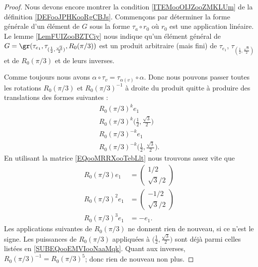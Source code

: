 \begin{proof}
    Nous devons encore montrer la condition \ref{ITEMooOIJZooZMKLUm} de la définition \ref{DEFooJPHKooRgCBJs}. Commençons par déterminer la forme générale d'un élément de \( G\) sous la forme \( \tau_a\circ r_0\) où \( r_0\) est une application linéaire. Le lemme \ref{LemFUIZooBZTCiy} nous indique qu'un élément général de \( G=\gr(\tau_{e_1}, \tau_{(\frac{ 1 }{2},\frac{ \sqrt{ 3 } }{2})}, R_0(\pi/3))\) est un produit arbitraire (mais fini) de \( \tau_{e_1}\), \( \tau_{(\frac{ 1 }{2},\frac{ \sqrt{ 3 } }{2})}\) et de \( R_0(\pi/3)\) et de leurs inverses.

    Comme toujours nous avons \( \alpha\circ\tau_v=\tau_{\alpha(v)}\circ \alpha\). Donc nous pouvons passer toutes les rotations \( R_0(\pi/3)\) et \( R_0(\pi/3)^{-1}\) à droite du produit quitte à produire des translations des formes suivantes :
    \begin{subequations}
        \begin{align}
            R_0(\pi/3)^ke_1\\
            R_0(\pi/3)^k\big( \frac{ 1 }{2},\frac{ \sqrt{ 3 } }{2} \big)\\
            R_0(\pi/3)^{-k}e_1\\
            R_0(\pi/3)^{-k}\big( \frac{ 1 }{2},\frac{ \sqrt{ 3 } }{2} \big).
        \end{align}
    \end{subequations}
    En utilisant la matrice \eqref{EQooMRRXooTebLlt} nous trouvons assez vite que
    \begin{subequations}        \label{SUBEQooEMVIooNaaMqk}
        \begin{align}
            R_0(\pi/3)e_1&=\begin{pmatrix}
                1/2    \\ 
                \sqrt{ 3 }/2
            \end{pmatrix}\\
            R_0(\pi/3)^2e_1&=\begin{pmatrix}
                -1/2    \\ 
                \sqrt{ 3 }/2    
            \end{pmatrix}\\
            R_0(\pi/3)^3e_1&=-e_1.
        \end{align}
    \end{subequations}
    Les applications suivantes de \( R_0(\pi/3)\) ne donnent rien de nouveau, si ce n'est le signe. Les puissances de \( R_0(\pi/3)\) appliquées à \( \big( \frac{ 1 }{2},\frac{ \sqrt{ 3 } }{2} \big)\) sont déjà parmi celles listées en \eqref{SUBEQooEMVIooNaaMqk}. Quant aux inverses, \( R_0(\pi/3)^{-1}=R_0(\pi/3)^5\); donc rien de nouveau non plus.


\end{proof}
